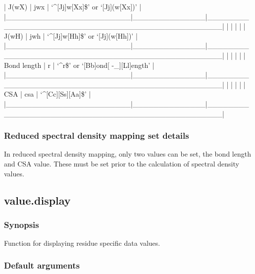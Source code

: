 | J(wX)                  | jwx          | `\^{}[Jj]w[Xx]\$' or `[Jj](w[Xx])'                   |
|\_\_\_\_\_\_\_\_\_\_\_\_\_\_\_\_\_\_\_\_\_\_\_\_|\_\_\_\_\_\_\_\_\_\_\_\_\_\_|\_\_\_\_\_\_\_\_\_\_\_\_\_\_\_\_\_\_\_\_\_\_\_\_\_\_\_\_\_\_\_\_\_\_\_\_\_\_\_\_\_\_\_\_\_\_\_\_\_\_|
|                        |              |                                                  |
| J(wH)                  | jwh          | `\^{}[Jj]w[Hh]\$' or `[Jj](w[Hh])'                   |
|\_\_\_\_\_\_\_\_\_\_\_\_\_\_\_\_\_\_\_\_\_\_\_\_|\_\_\_\_\_\_\_\_\_\_\_\_\_\_|\_\_\_\_\_\_\_\_\_\_\_\_\_\_\_\_\_\_\_\_\_\_\_\_\_\_\_\_\_\_\_\_\_\_\_\_\_\_\_\_\_\_\_\_\_\_\_\_\_\_|
|                        |              |                                                  |
| Bond length            | r            | `\^{}r\$' or `[Bb]ond[ -\_][Ll]ength'                 |
|\_\_\_\_\_\_\_\_\_\_\_\_\_\_\_\_\_\_\_\_\_\_\_\_|\_\_\_\_\_\_\_\_\_\_\_\_\_\_|\_\_\_\_\_\_\_\_\_\_\_\_\_\_\_\_\_\_\_\_\_\_\_\_\_\_\_\_\_\_\_\_\_\_\_\_\_\_\_\_\_\_\_\_\_\_\_\_\_\_|
|                        |              |                                                  |
| CSA                    | csa          | `\^{}[Cc][Ss][Aa]\$'                                 |
|\_\_\_\_\_\_\_\_\_\_\_\_\_\_\_\_\_\_\_\_\_\_\_\_|\_\_\_\_\_\_\_\_\_\_\_\_\_\_|\_\_\_\_\_\_\_\_\_\_\_\_\_\_\_\_\_\_\_\_\_\_\_\_\_\_\_\_\_\_\_\_\_\_\_\_\_\_\_\_\_\_\_\_\_\_\_\_\_\_|



\subsubsection{Reduced spectral density mapping set details}

In reduced spectral density mapping, only two values can be set, the bond length and CSA
value.  These must be set prior to the calculation of spectral density values.


\newpage

\subsection{value.display}


\subsubsection{Synopsis}

Function for displaying residue specific data values.

\subsubsection{Default arguments}

